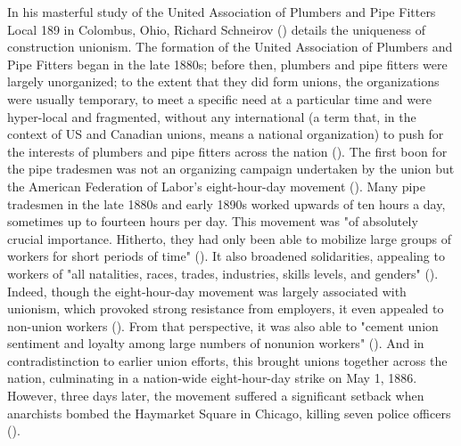 \documentclass[12pt]{article}
\begin{document}
In his masterful study of the United Association of Plumbers and Pipe Fitters Local 189 in Colombus, Ohio, Richard Schneirov (\citeyear{schneirovPrideSolidarityHistory1993}) details the uniqueness of construction unionism. The formation of the United Association of Plumbers and Pipe Fitters began in the late 1880s; before then, plumbers and pipe fitters were largely unorganized; to the extent that they did form unions, the organizations were usually temporary, to meet a specific need at a particular time and were hyper-local and fragmented, without any international (a term that, in the context of US and Canadian unions, means a national organization) to push for the interests of plumbers and pipe fitters across the nation (\citeyear[58]{schneirovPrideSolidarityHistory1993}). The first boon for the pipe tradesmen was not an organizing campaign undertaken by the union but the American Federation of Labor’s eight-hour-day movement (\citeyear[11, 43–45]{schneirovPrideSolidarityHistory1993}). Many pipe tradesmen in the late 1880s and early 1890s worked upwards of ten hours a day, sometimes up to fourteen hours per day. This movement was "of absolutely crucial importance. Hitherto, they had only been able to mobilize large groups of workers for short periods of time" (\citeyear[43–45]{schneirovPrideSolidarityHistory1993}). It also broadened solidarities, appealing to workers of "all natalities, races, trades, industries, skills levels, and genders" (\citeyear[43]{schneirovPrideSolidarityHistory1993}). Indeed, though the eight-hour-day movement was largely associated with unionism, which provoked strong resistance from employers, it even appealed to non-union workers (\citeyear[45]{schneirovPrideSolidarityHistory1993}). From that perspective, it was also able to "cement union sentiment and loyalty among large numbers of nonunion workers" (\citeyear[45]{schneirovPrideSolidarityHistory1993}). And in contradistinction to earlier union efforts, this brought unions together across the nation, culminating in a nation-wide eight-hour-day strike on May 1, 1886. However, three days later, the movement suffered a significant setback when anarchists bombed the Haymarket Square in Chicago, killing seven police officers (\citeyear[45]{schneirovPrideSolidarityHistory1993}).
\end{document}
